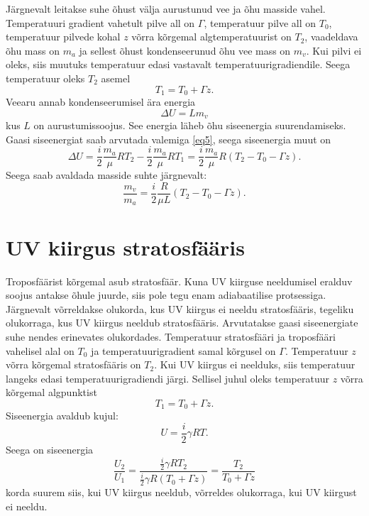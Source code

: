 \documentclass{trkut}%
\begin{document}
Järgnevalt leitakse suhe õhust välja aurustunud vee ja õhu masside vahel. Temperatuuri gradient vahetult pilve all on $\Gamma$, temperatuur pilve all on $T_0$, temperatuur pilvede kohal $z$ võrra kõrgemal algtemperatuurist on $T_2$, vaadeldava õhu mass on $m_a$ ja sellest õhust kondenseerunud õhu vee mass on $m_v$. Kui pilvi ei oleks, siis muutuks temperatuur edasi vastavalt temperatuurigradiendile. Seega temperatuur oleks $T_2$ asemel
\begin{equation}
T_1 = T_0 + \Gamma z.
\end{equation}
Veearu annab kondenseerumisel ära energia
\begin{equation}
\Delta U = L m_v
\end{equation}
kus $L$ on aurustumissoojus. See energia läheb õhu siseenergia suurendamiseks. Gaasi siseenergiat saab arvutada valemiga \ref{eq5}, seega siseenergia muut on
\begin{equation}
\Delta U =\frac{i}{2}\frac{m_a}{\mu}RT_2 - \frac{i}{2}\frac{m_a}{\mu}RT_1  = \frac{i}{2}\frac{m_a}{\mu}R\left(T_2 - T_0 - \Gamma z\right).
\end{equation}
Seega saab avaldada masside suhte järgnevalt:
\begin{equation}
\frac{m_v}{m_a} = \frac{i}{2}\frac{R}{\mu L}\left(T_2- T_0 - \Gamma z\right).
\end{equation}



\section{UV kiirgus stratosfääris}
Troposfäärist kõrgemal asub stratosfäär. Kuna UV kiirguse neeldumisel eralduv soojus antakse õhule juurde, siis pole tegu enam adiabaatilise protsessiga. Järgnevalt võrreldakse olukorda, kus UV kiirgus ei neeldu stratosfääris, tegeliku olukorraga, kus UV kiirgus neeldub stratosfääris. Arvutatakse gaasi siseenergiate suhe nendes erinevates olukordades. Temperatuur stratosfääri ja troposfääri vahelisel alal on $T_0$ ja temperatuurigradient samal kõrgusel on $\Gamma$. Temperatuur $z$ võrra kõrgemal stratosfääris on $T_2$. Kui UV kiirgus ei neelduks, siis temperatuur langeks edasi temperatuurigradiendi järgi. Sellisel juhul oleks temperatuur $z$ võrra kõrgemal algpunktist
\begin{equation}
T_1 = T_0 + \Gamma z.
\end{equation}
Siseenergia avaldub kujul:
\begin{equation}
U = \frac{i}{2}\gamma RT.
\end{equation}
Seega on siseenergia 
\begin{equation}
\frac{U_2}{U_1} = \frac{\frac{i}{2}\gamma RT_2}{\frac{i}{2}\gamma R\left(T_0 + \Gamma z\right)} = \frac{T_2}{T_0+\Gamma z}
\end{equation}
korda suurem siis, kui UV kiirgus neeldub, võrreldes olukorraga, kui UV kiirgust ei neeldu.
\end{document}
